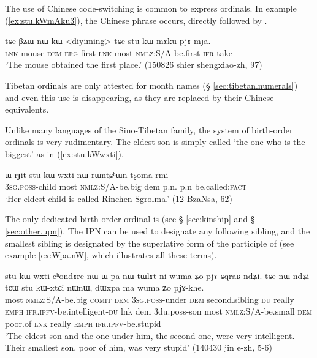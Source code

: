 The use of Chinese code-switching is common to express ordinals. In example (\ref{ex:stu.kWmAku3}), the Chinese phrase  occurs, directly followed by .

\begin{exe}
\ex  \label{ex:stu.kWmAku3}
 \gll tɕe βʑɯ nɯ kɯ <diyiming> tɕe stu kɯ-mɤku pjɤ-mɟa. \\
 \textsc{lnk} mouse \textsc{dem} \textsc{erg} first \textsc{lnk} most \textsc{nmlz}:S/A-be.first \textsc{ifr}-take \\
\glt `The mouse obtained the first place.' (150826 shier shengxiao-zh, 97)
\end{exe}

Tibetan ordinals are only attested for month names (§ \ref{sec:tibetan.numerals}) and even this use is disappearing, as they are replaced by their Chinese equivalents.

Unlike many languages of the Sino-Tibetan family, the system of birth-order ordinals is very rudimentary. The eldest son is simply called  `the one who is the biggest' as in (\ref{ex:stu.kWwxti}).

\begin{exe}
\ex  \label{ex:stu.kWwxti}
\gll ɯ-rɟit stu kɯ-wxti nɯ rɯntɕʰɯn tʂoma rmi\\
\textsc{3sg}.\textsc{poss}-child most \textsc{nmlz}:S/A-be.big dem p.n. p.n be.called:\textsc{fact}\\
\glt `Her eldest child is called Rinchen Sgrolma.' (12-BzaNsa, 62)
\end{exe}

The only dedicated birth-order ordinal is  (see § \ref{sec:kinship} and § \ref{sec:other.upn}). The IPN  can be used to designate any following sibling, and the smallest sibling is designated by the superlative form of the participle of  (see example \ref{ex:Wpa.nW}, which illustrates all these terms).

\begin{exe}
\ex  \label{ex:Wpa.nW}
\gll stu kɯ-wxti cʰondɤre nɯ ɯ-pa nɯ tɯlɤt ni wuma ʑo pjɤ-ɕqraʁ-ndʑi. tɕe nɯ ndʑi-tɕɯ stu kɯ-xtɕi nɯnɯ, dɯxpa ma wuma ʑo pjɤ-khe. \\
most \textsc{nmlz}:S/A-be.big \textsc{comit} \textsc{dem} \textsc{3sg}.\textsc{poss}-under \textsc{dem} second.sibling \textsc{du} really \textsc{emph} \textsc{ifr}.\textsc{ipfv}-be.intelligent-\textsc{du} lnk dem 3du.poss-son most \textsc{nmlz}:S/A-be.small \textsc{dem} poor.of \textsc{lnk} really \textsc{emph} \textsc{ifr}.\textsc{ipfv}-be.stupid \\
\glt `The eldest son and the one under him, the second one, were very intelligent. Their smallest son, poor of him, was very stupid' (140430 jin e-zh, 5-6) 
 \end{exe}
 
